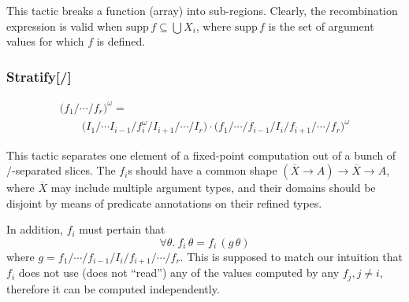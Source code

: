 \documentclass{article}
\begin{document}
This tactic breaks a function (array) into sub-regions. Clearly, the recombination expression is
valid when $\mathrm{supp}\,f \subseteq \bigcup X_i$, where $\mathrm{supp}\,f$ is the set of
argument values for which $f$ is defined.

\subsubsection{Stratify[/]}

\[
\begin{array}{l}
  \big(f_1 / \cdots / f_r\big)^\omega = \\
  \qquad
  \big(I_1 / \cdots I_{i-1} / f_i^\omega / I_{i+1} / \cdots / I_{r}\big)
  \cdot \big(f_1 / \cdots / f_{i-1} / I_i / f_{i+1} / \cdots / f_r\big)^\omega
\end{array}
\]

This tactic separates one element of a fixed-point computation out of a bunch
of $/$-separated slices. The $f_i$s should have a common shape 
$(\overline{X}\to A)\to \overline{X} \to A$,
where $\overline{X}$ may include multiple argument types, and their domains
should be disjoint by means of predicate annotations on their refined types.

In addition, $f_i$ must pertain that
\[\forall\theta.~ f_i\,\theta = f_i\,(g\,\theta)\]
%
where $g = f_1 / \cdots / f_{i-1} / I_i / f_{i+1} / \cdots / f_r$.
This is supposed to match our intuition that $f_i$ does not use (does not ``read'')
any of the values computed by any $f_j, j\neq i$, therefore it can be computed independently.



\end{document}

